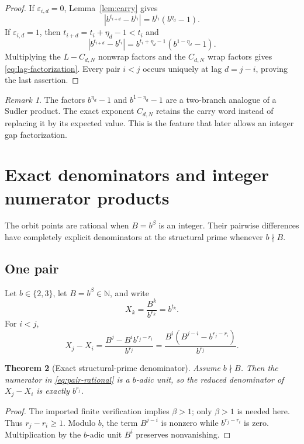 \documentclass[11pt,oneside]{article}
\newtheorem{theorem}{Theorem}[section]
\theoremstyle{definition}
\theoremstyle{remark}
\newtheorem{remark}[theorem]{Remark}
\newcommand{\N}{\mathbb N}
\begin{document}
\begin{proof}
If $\varepsilon_{i,d}=0$, Lemma~\ref{lem:carry} gives
\[
 |b^{t_{i+d}}-b^{t_i}|=b^{t_i}(b^{\eta_d}-1).
\]
If $\varepsilon_{i,d}=1$, then $t_{i+d}=t_i+\eta_d-1<t_i$ and
\[
 |b^{t_{i+d}}-b^{t_i}|
 =b^{t_i+\eta_d-1}(b^{1-\eta_d}-1).
\]
Multiplying the $L-C_{d,N}$ nonwrap factors and the $C_{d,N}$ wrap factors gives
\eqref{eq:lag-factorization}.  Every pair $i<j$ occurs uniquely at lag $d=j-i$, proving the
last assertion.
\end{proof}

\begin{remark}
The factors $b^{\eta_d}-1$ and $b^{1-\eta_d}-1$ are a two-branch analogue of a Sudler product.
The exact exponent $C_{d,N}$ retains the carry word instead of replacing it by its expected
value.  This is the feature that later allows an integer gap factorization.
\end{remark}

\section{Exact denominators and integer numerator products}
\label{sec:denominators}

The orbit points are rational when $B=b^\beta$ is an integer.  Their pairwise differences have
completely explicit denominators at the structural prime whenever $b\nmid B$.

\subsection{One pair}

Let $b\in\{2,3\}$, let $B=b^\beta\in\N$, and write
\[
 X_k=\frac{B^k}{b^{r_k}}=b^{t_k}.
\]
For $i<j$,
\begin{equation}
 X_j-X_i=
 \frac{B^j-B^i b^{r_j-r_i}}{b^{r_j}}
 =\frac{B^i(B^{j-i}-b^{r_j-r_i})}{b^{r_j}}.
 \label{eq:pair-rational}
\end{equation}

\begin{theorem}[Exact structural-prime denominator]
\label{thm:exact-denominator}
Assume $b\nmid B$.  Then the numerator in \eqref{eq:pair-rational} is a $b$-adic unit, so the
reduced denominator of $X_j-X_i$ is exactly $b^{r_j}$.
\end{theorem}

\begin{proof}
The imported finite verification implies $\beta>1$; only $\beta>1$ is needed here.  Thus
$r_j-r_i\ge1$.  Modulo $b$, the term $B^{j-i}$ is nonzero while
$b^{r_j-r_i}$ is zero.  Multiplication by the $b$-adic unit $B^i$ preserves nonvanishing.
\end{proof}
\end{document}
